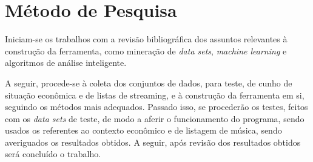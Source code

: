 \chapter{Método de Pesquisa}
\label{c.metodologia}

Iniciam-se os trabalhos com a revisão bibliográfica dos assuntos relevantes à construção da ferramenta, como mineração de \textit{data sets}, \textit{machine learning} e algoritmos de análise inteligente. 

A seguir, procede-se à coleta dos conjuntos de dados, para teste, de cunho de situação econômica e de listas de streaming, e à construção da ferramenta em si, seguindo os métodos mais adequados. Passado isso, se procederão os testes, feitos com os \textit{data sets} de teste, de modo a aferir o funcionamento do programa, sendo usados os referentes ao contexto econômico e de listagem de música, sendo averiguados os resultados obtidos. A seguir, após revisão dos resultados obtidos será concluído o trabalho.